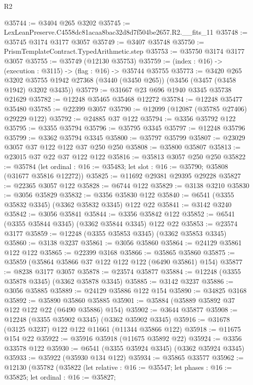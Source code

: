 \begin{lexlean}{R2}
\begin{coremodule}
@35744 := @3404 @265 @3202
@35745 := LexLeanPreserve.C4558dc81acaa8bac32d8d7f504be2657.R2.__fits_11
@35748 := @35745 @3174 @3177 @3057
@35749 := @3407 @35748
@35750 := PrismTemplateContract.TypedArithmetic.step
@35753 := @35750 @3174 @3177 @3057
@35755 := @35749 (@12130 @35753)
@35759 := (index : @16) -> (execution : @3115) -> (flag : @16) -> @35744 @35755
@35773 := @3420
    @265
    @3202
    @35755
    @1942
    @27368
    (@3440 (@3450 @265))
    (@3456 (@3457 (@3458 @1942) @3202 @3435))
@35779 := @31667 @23 @696 @1940 @3345 @35738 @21629
@35782 := @12248 @35465 @35468 @12272
@35784 := @12248 @35477 @35480
@35785 := @22399 @3057
@35790 := @12099 (@12087 (@35785 @27406) @29229 @122)
@35792 := @24885 @37 @122
@35794 := @3356 @35792 @122
@35795 := @3355 @35794
@35796 := @35795 @3345
@35797 := @12248 @35796
@35799 := @3362 @35794 @3345
@35800 := @35797 @35799
@35807 := @23029 @3057 @37 @122 @122 @37 @250 @250
@35808 := @35800 @35807
@35813 := @23015 @37 @22 @37 @122 @122
@35816 := @35813 @3057 @250 @250
@35822 := @35784
    (let ordinal : @16 := @35483; let slot : @16 := @35790; @35808 (@31677 @35816 @12272))
@35825 := @11692 @29381 @29395 @29228
@35827 := @22365 @3057 @122
@35828 := @6744 @122
@35829 := @3138 @3210
@35830 := @3056 @35829
@35832 := @3356 @35830 @122
@35840 := @6541 (@3355 @35832 @3345) (@3362 @35832 @3345) @122 @22
@35841 := @3142 @3240
@35842 := @3056 @35841
@35844 := @3356 @35842 @122
@35852 := @6541 (@3355 @35844 @3345) (@3362 @35844 @3345) @122 @22
@35853 := @23574 @3177
@35859 := @12248 (@3355 @35853 @3345) (@3362 @35853 @3345)
@35860 := @3138 @3237
@35861 := @3056 @35860
@35864 := @24129 @35861 @122 @122
@35865 := @22399 @3168
@35866 := @35865 @35860
@35875 := @35859 (@35864 @35866 @37 @122 @122 @122 (@6490 @35861) @154)
@35877 := @8238 @3177 @3057
@35878 := @23574 @35877
@35884 := @12248 (@3355 @35878 @3345) (@3362 @35878 @3345)
@35885 := @3142 @3237
@35886 := @3056 @35885
@35889 := @24129 @35886 @122 @154
@35890 := @34825 @3168
@35892 := @35890 @35860 @35885
@35901 := @35884 (@35889 @35892 @37 @122 @122 @22 (@6490 @35886) @154)
@35902 := @3644 @35877
@35908 := @12248 (@3355 @35902 @3345) (@3362 @35902 @3345)
@35916 := @31678 (@3125 @3237) @122 @122 @11661 (@11344 @35866 @122)
@35918 := @11675 @154 @22
@35922 := @35916 @35918 (@11675 @35892 @22)
@35924 := @3356 @33578 @122
@35930 := @6541 (@3355 @35924 @3345) (@3362 @35924 @3345)
@35933 := @35922 (@35930 @134 @122)
@35934 := @35865 @33577
@35962 := @12130
    (@35782
      (@35822
        (let relative : @16 := @35547;
        let phases : @16 := @35825;
        let ordinal : @16 := @35827;

\end{coremodule}
\end{lexlean}
